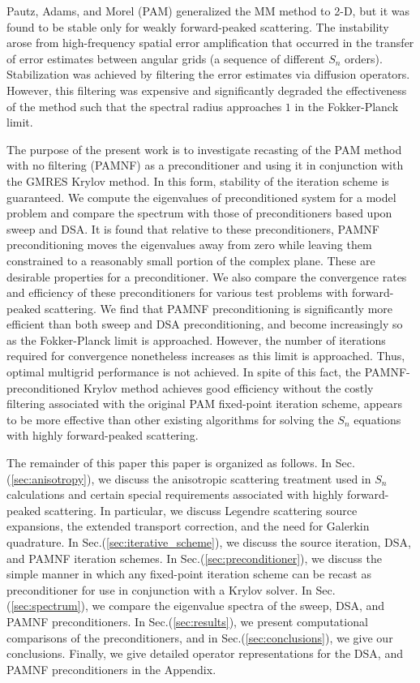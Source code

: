 \documentclass[preprint,10pt]{elsarticle}
\renewcommand{\(}{\left(}
\renewcommand{\)}{\right)}
\renewcommand{\[}{\left[}
\renewcommand{\]}{\right]}
\begin{document}
Pautz, Adams, and Morel (PAM) \cite{multigrid_2d} generalized the MM method to
2-D, but it was found to be stable only for weakly forward-peaked scattering.
The instability arose from high-frequency spatial error amplification that
occurred in the transfer of error estimates between angular grids (a sequence
of different $S_n$ orders). Stabilization was achieved by filtering the error
estimates via diffusion operators. However, this filtering was expensive and
significantly degraded the effectiveness of the method such that the spectral
radius approaches $1$ in the Fokker-Planck limit.

The purpose of the present work is to investigate recasting of the PAM method
with no filtering (PAMNF) as a preconditioner and using it in conjunction with
the GMRES Krylov method. In this form, stability of the iteration scheme is
guaranteed. We compute the eigenvalues of preconditioned system for a model
problem and compare the spectrum with those of preconditioners based upon
sweep and DSA. It is found that relative to these preconditioners,
PAMNF preconditioning moves the eigenvalues away from zero while leaving them
constrained to a reasonably small portion of the complex plane. These are
desirable properties for a preconditioner. We also compare the convergence
rates and efficiency of these preconditioners for various test problems with
forward-peaked scattering. We find that PAMNF preconditioning
is significantly more efficient than both sweep and DSA
preconditioning, and become increasingly so as the Fokker-Planck limit is
approached. However, the number of iterations required for convergence
nonetheless increases as this limit is approached. Thus, optimal multigrid
performance is not achieved. In spite of this fact, the PAMNF-preconditioned
Krylov method achieves good efficiency without the costly filtering associated
with the original PAM fixed-point iteration scheme, appears to be more
effective than other existing algorithms for solving the $S_n$ equations with
highly forward-peaked scattering.

The remainder of this paper this paper is organized as follows. In
Sec.(\ref{sec:anisotropy}), we
discuss the anisotropic scattering treatment used in $S_n$ calculations and
certain special requirements associated with highly forward-peaked scattering.
In particular, we discuss Legendre scattering source expansions, the extended
transport correction, and the need for Galerkin quadrature. In
Sec.(\ref{sec:iterative_scheme}), we
discuss the source iteration, DSA, and PAMNF iteration schemes. In
Sec.(\ref{sec:preconditioner}), we
discuss the simple manner in which any fixed-point iteration scheme can be
recast as preconditioner for use in conjunction with a Krylov solver. In
Sec.(\ref{sec:spectrum}),
we compare the eigenvalue spectra of the sweep, DSA, and PAMNF
preconditioners. In Sec.(\ref{sec:results}), we present computational comparisons of the
preconditioners, and in Sec.(\ref{sec:conclusions}), we give our conclusions. Finally, we give
detailed operator representations for the DSA, and PAMNF
preconditioners in the Appendix.
\end{document}
